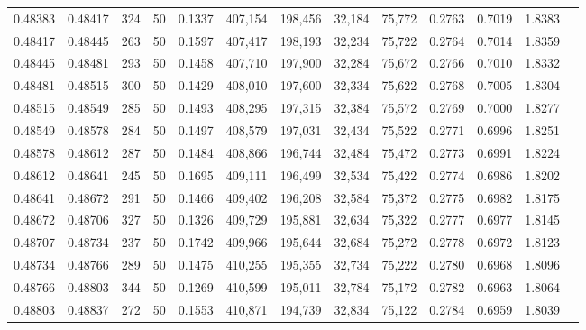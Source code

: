 \begin{tabular}{rrrrrrrrrrrrr}
0.48383 & 0.48417 &   324 &  50 &                                     0.1337 & 407,154 & 198,456 &  32,184 &  75,772 & 0.2763 & 0.7019 & 1.8383 \\
0.48417 & 0.48445 &   263 &  50 &                                     0.1597 & 407,417 & 198,193 &  32,234 &  75,722 & 0.2764 & 0.7014 & 1.8359 \\
0.48445 & 0.48481 &   293 &  50 &                                     0.1458 & 407,710 & 197,900 &  32,284 &  75,672 & 0.2766 & 0.7010 & 1.8332 \\
0.48481 & 0.48515 &   300 &  50 &                                     0.1429 & 408,010 & 197,600 &  32,334 &  75,622 & 0.2768 & 0.7005 & 1.8304 \\
0.48515 & 0.48549 &   285 &  50 &                                     0.1493 & 408,295 & 197,315 &  32,384 &  75,572 & 0.2769 & 0.7000 & 1.8277 \\
0.48549 & 0.48578 &   284 &  50 &                                     0.1497 & 408,579 & 197,031 &  32,434 &  75,522 & 0.2771 & 0.6996 & 1.8251 \\
0.48578 & 0.48612 &   287 &  50 &                                     0.1484 & 408,866 & 196,744 &  32,484 &  75,472 & 0.2773 & 0.6991 & 1.8224 \\
0.48612 & 0.48641 &   245 &  50 &                                     0.1695 & 409,111 & 196,499 &  32,534 &  75,422 & 0.2774 & 0.6986 & 1.8202 \\
0.48641 & 0.48672 &   291 &  50 &                                     0.1466 & 409,402 & 196,208 &  32,584 &  75,372 & 0.2775 & 0.6982 & 1.8175 \\
0.48672 & 0.48706 &   327 &  50 &                                     0.1326 & 409,729 & 195,881 &  32,634 &  75,322 & 0.2777 & 0.6977 & 1.8145 \\
0.48707 & 0.48734 &   237 &  50 &                                     0.1742 & 409,966 & 195,644 &  32,684 &  75,272 & 0.2778 & 0.6972 & 1.8123 \\
0.48734 & 0.48766 &   289 &  50 &                                     0.1475 & 410,255 & 195,355 &  32,734 &  75,222 & 0.2780 & 0.6968 & 1.8096 \\
0.48766 & 0.48803 &   344 &  50 &                                     0.1269 & 410,599 & 195,011 &  32,784 &  75,172 & 0.2782 & 0.6963 & 1.8064 \\
0.48803 & 0.48837 &   272 &  50 &                                     0.1553 & 410,871 & 194,739 &  32,834 &  75,122 & 0.2784 & 0.6959 & 1.8039 \\

\end{tabular}
